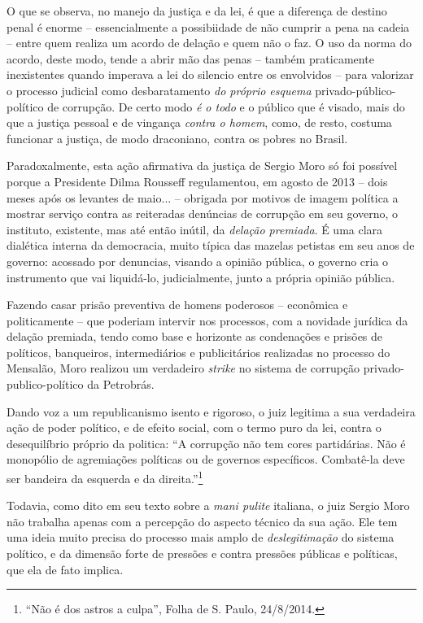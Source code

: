 O que se observa, no manejo da justiça e da lei, é que a diferença de
destino penal é enorme -- essencialmente a possibiidade de não cumprir a
pena na cadeia -- entre quem realiza um acordo de delação e quem não o
faz. O uso da norma do acordo, deste modo, tende a abrir mão das penas
-- também praticamente inexistentes quando imperava a lei do silencio
entre os envolvidos -- para valorizar o processo judicial como
desbaratamento \emph{do próprio esquema} privado-público-político de
corrupção. De certo modo \emph{é o todo} e o público que é visado, mais
do que a justiça pessoal e de vingança \emph{contra o homem}, como, de
resto, costuma funcionar a justiça, de modo draconiano, contra os pobres
no Brasil.

Paradoxalmente, esta ação afirmativa da justiça de Sergio Moro só foi
possível porque a Presidente Dilma Rousseff regulamentou, em agosto de
2013 -- dois meses após os levantes de maio... -- obrigada por motivos
de imagem política a mostrar serviço contra as reiteradas denúncias de
corrupção em seu governo, o instituto, existente, mas até então inútil,
da \emph{delação premiada}. É uma clara dialética interna da democracia,
muito típica das mazelas petistas em seu anos de governo: acossado por
denuncias, visando a opinião pública, o governo cria o instrumento que
vai liquidá-lo, judicialmente, junto a própria opinião pública.

Fazendo casar prisão preventiva de homens poderosos -- econômica e
politicamente -- que poderiam intervir nos processos, com a novidade
jurídica da delação premiada, tendo como base e horizonte as condenações
e prisões de políticos, banqueiros, intermediários e publicitários
realizadas no processo do Mensalão, Moro realizou um verdadeiro
\emph{strike} no sistema de corrupção privado-publico-político da
Petrobrás.

Dando voz a um republicanismo isento e rigoroso, o juiz legitima a sua
verdadeira ação de poder político, e de efeito social, com o termo puro
da lei, contra o desequilíbrio próprio da politica: ``A corrupção não
tem cores partidárias. Não é monopólio de agremiações políticas ou de
governos específicos. Combatê-la deve ser bandeira da esquerda e da
direita.''\footnote{``Não é dos astros a culpa'', Folha de S. Paulo,
  24/8/2014.}

Todavia, como dito em seu texto sobre a \emph{mani pulite} italiana, o
juiz Sergio Moro não trabalha apenas com a percepção do aspecto técnico
da sua ação. Ele tem uma ideia muito precisa do processo mais amplo de
\emph{deslegitimação} do sistema político, e da dimensão forte de
pressões e contra pressões públicas e políticas, que ela de fato
implica.

